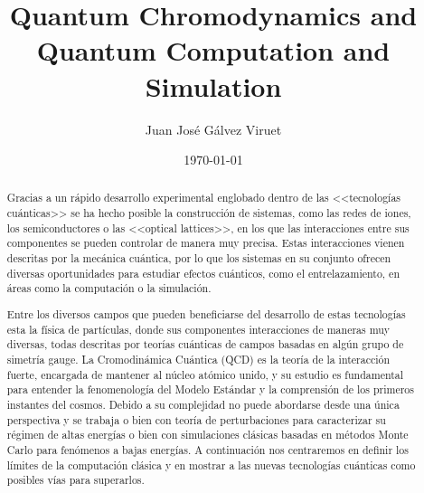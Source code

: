 \documentclass[a4paper,10pt]{article}
\begin{document}
\title{Quantum Chromodynamics and \\ Quantum Computation and Simulation}
\author{Juan José Gálvez Viruet}
\date{\today}
\maketitle

\begin{abstract}
\noindent Gracias a un rápido desarrollo experimental englobado dentro de las <<tecnologías cuánticas>> se ha hecho posible la construcción de sistemas, como las redes de iones, los semiconductores o las <<optical lattices>>, en los que las interacciones entre sus componentes se pueden controlar de manera muy precisa. Estas interacciones vienen descritas por la mecánica cuántica, por lo que los sistemas en su conjunto ofrecen diversas oportunidades para estudiar efectos cuánticos, como el entrelazamiento, en áreas como la computación o la simulación.

Entre los diversos campos que pueden beneficiarse del desarrollo de estas tecnologías esta la física de partículas, donde sus componentes interacciones de maneras muy diversas, todas descritas por teorías cuánticas de campos basadas en algún grupo de simetría gauge. La Cromodinámica Cuántica (QCD) es la teoría de la interacción fuerte, encargada de mantener al núcleo atómico unido, y su estudio es fundamental para entender la fenomenología del Modelo Estándar y la comprensión de los primeros instantes del cosmos. Debido a su complejidad no puede abordarse desde una única perspectiva y se trabaja o bien con teoría de perturbaciones para caracterizar su régimen de altas energías o bien con simulaciones clásicas basadas en métodos Monte Carlo para fenómenos a bajas energías. A continuación nos centraremos en definir los límites de la computación clásica y en mostrar a las nuevas tecnologías cuánticas como posibles vías para superarlos.
\end{abstract}
\end{document}
